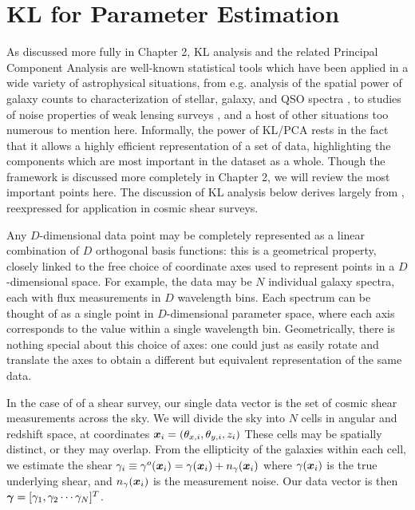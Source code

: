 \section{KL for Parameter Estimation}
\label{sec:kl_intro}
As discussed more fully in Chapter 2,
KL analysis and the related Principal Component Analysis are well-known
statistical tools which have been applied in a wide variety of astrophysical
situations, from e.g. analysis of the spatial power of galaxy counts
\citep{Vogeley96, Szalay03, Pope04}
to characterization of stellar, galaxy, and QSO spectra
\citep{Connolly95, Connolly99, Yip04a, Yip04b},
to studies of noise properties of weak lensing surveys
\citep{Kilbinger06, Munshi06}, and a host of other situations too numerous
to mention here.  Informally, the power of KL/PCA rests in the fact that 
it allows a highly efficient representation of a set of data, highlighting
the components which are most important in the dataset as a whole.
Though the framework is discussed more completely in Chapter 2, we will
review the most important points here.
The discussion of KL analysis below derives largely from \citet{Vogeley96},
reexpressed for application in cosmic shear surveys.

Any $D$-dimensional data point may be completely represented
as a linear combination of $D$ orthogonal basis functions: this is
a geometrical property, closely linked to the free choice of coordinate axes
used to represent points in a $D$-dimensional space.
For example, the data may be $N$ individual galaxy spectra, each with flux
measurements in $D$ wavelength bins.  Each spectrum can be thought of as a
single point in $D$-dimensional parameter space, where each axis corresponds
to the value within a single wavelength bin.  
Geometrically, there is nothing special about
this choice of axes: one could just as easily rotate and translate the axes
to obtain a different but equivalent representation of the same data.

In the case of of a shear survey, our single data vector is the set of
cosmic shear measurements across the sky.  We will divide the sky into $N$
cells in angular and redshift space, at coordinates
$\boldsymbol{x}_i = (\theta_{x,i}, \theta_{y,i}, z_i)$
These cells may be spatially distinct, or they may overlap.
From the ellipticity of the galaxies within each cell, we
estimate the shear
$\gamma_i \equiv \gamma^o(\boldsymbol{x}_i) = 
\gamma(\boldsymbol{x}_i) + n_\gamma(\boldsymbol{x}_i)$
where $\gamma(\boldsymbol{x}_i)$ is the true underlying shear,
and $n_\gamma(\boldsymbol{x}_i)$ is the measurement noise.
Our data vector is then
$\boldsymbol{\gamma} = [\gamma_1, \gamma_2 \cdots \gamma_N]^T$.

